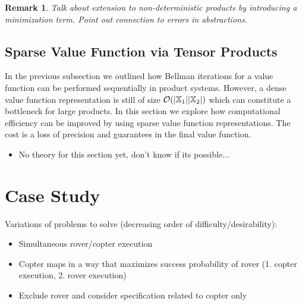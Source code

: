 \documentclass[conference]{IEEEtran}
\newtheorem{remark}{Remark}
\newcommand{\red}[1]{{\color{red} #1 }}
\begin{document}
\begin{remark}
  \red{Talk about extension to non-deterministic products by introducing a minimization term. Point out connection to errors in abstractions.} 
\end{remark}

\subsection{Sparse Value Function via Tensor Products}

In the previous subsection we outlined how Bellman iterations for a value function can be performed sequentially in product systems. However, a dense value function representation is still of size $\mathcal O (|\mathbb{X}_1| |\mathbb{X}_2|)$ which can constitute a bottleneck for large products. In this section we explore how computational efficiency can be improved by using sparse value function representations. The cost is a loss of precision and guarantees in the final value function.

\begin{itemize}
  \item \red{No theory for this section yet, don't know if its possible...}
\end{itemize}

\section{Case Study}

\red{Variations of problems to solve (decreasing order of difficulty/desirability):
\begin{itemize}
  \item Simultaneous rover/copter execution
  \item Copter maps in a way that maximizes success probability of rover (1. copter execution, 2. rover execution)
  \item Exclude rover and consider specification related to copter only
\end{itemize}}
\end{document}
